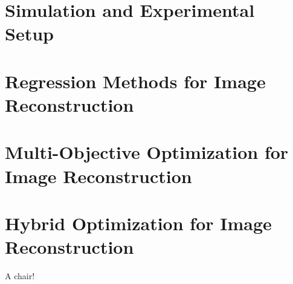 \section{Simulation and Experimental Setup} \label{sec:method}

\section{Regression Methods for Image Reconstruction} \label{sec:method:first}

\section{Multi-Objective Optimization for Image Reconstruction} \label{sec:method:second}

\section{Hybrid Optimization for Image Reconstruction} \label{sec:method:third}







A chair!